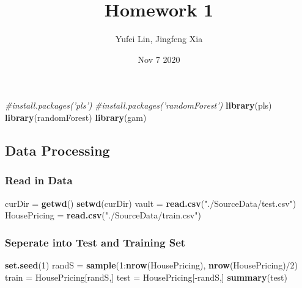 \documentclass[]{article}
\title{Homework 1}
\author{Yufei Lin, Jingfeng Xia}
\date{Nov 7 2020}
\newenvironment{Shaded}{\begin{snugshade}}{\end{snugshade}}
\newcommand{\KeywordTok}[1]{\textcolor[rgb]{0.13,0.29,0.53}{\textbf{{#1}}}}
\newcommand{\DecValTok}[1]{\textcolor[rgb]{0.00,0.00,0.81}{{#1}}}
\newcommand{\StringTok}[1]{\textcolor[rgb]{0.31,0.60,0.02}{{#1}}}
\newcommand{\CommentTok}[1]{\textcolor[rgb]{0.56,0.35,0.01}{\textit{{#1}}}}
\newcommand{\NormalTok}[1]{{#1}}
\begin{document}
\maketitle

\begin{Shaded}
\begin{Highlighting}[]
\CommentTok{#install.packages('pls')}
\CommentTok{#install.packages('randomForest')}
\KeywordTok{library}\NormalTok{(pls)}
\KeywordTok{library}\NormalTok{(randomForest)}
\KeywordTok{library}\NormalTok{(gam)}
\end{Highlighting}
\end{Shaded}

\subsection{Data Processing}\label{data-processing}

\subsubsection{Read in Data}\label{read-in-data}

\begin{Shaded}
\begin{Highlighting}[]
\NormalTok{curDir =}\StringTok{ }\KeywordTok{getwd}\NormalTok{()}
\KeywordTok{setwd}\NormalTok{(curDir)}
\NormalTok{vault =}\StringTok{ }\KeywordTok{read.csv}\NormalTok{(}\StringTok{"./SourceData/test.csv"}\NormalTok{)}
\NormalTok{HousePricing =}\StringTok{ }\KeywordTok{read.csv}\NormalTok{(}\StringTok{"./SourceData/train.csv"}\NormalTok{)}
\end{Highlighting}
\end{Shaded}

\subsubsection{Seperate into Test and Training
Set}\label{seperate-into-test-and-training-set}

\begin{Shaded}
\begin{Highlighting}[]
\KeywordTok{set.seed}\NormalTok{(}\DecValTok{1}\NormalTok{)}
\NormalTok{randS =}\StringTok{ }\KeywordTok{sample}\NormalTok{(}\DecValTok{1}\NormalTok{:}\KeywordTok{nrow}\NormalTok{(HousePricing), }\KeywordTok{nrow}\NormalTok{(HousePricing)/}\DecValTok{2}\NormalTok{)}
\NormalTok{train =}\StringTok{ }\NormalTok{HousePricing[randS,]}
\NormalTok{test =}\StringTok{ }\NormalTok{HousePricing[-randS,]}
\KeywordTok{summary}\NormalTok{(test)}
\end{Highlighting}
\end{Shaded}
\end{document}
